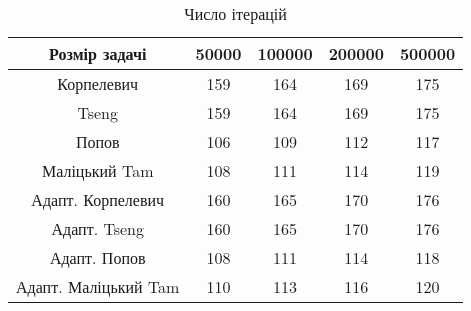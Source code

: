 \begin{table}[H]
	\centering
	\begin{tabular}{|c||c|c|c|c|}\hline
		Розмір задачі & 50000 & 100000 & 200000 & 500000 \\ \hline \hline
		Корпелевич & 159 & 164 & 169 & 175 \\ \hline
		Tseng & 159 & 164 & 169 & 175 \\ \hline
		Попов & 106 & 109 & 112 & 117 \\ \hline
		Маліцький Tam & 108 & 111 & 114 & 119 \\ \hline \hline
		Адапт. Корпелевич & 160 & 165 & 170 & 176 \\ \hline
		Адапт. Tseng & 160 & 165 & 170 & 176 \\ \hline
		Адапт. Попов & 108 & 111 & 114 & 118 \\ \hline
		Адапт. Маліцький Tam & 110 & 113 & 116 & 120 \\ \hline
	\end{tabular}
	\caption{Число ітерацій}
\end{table}

